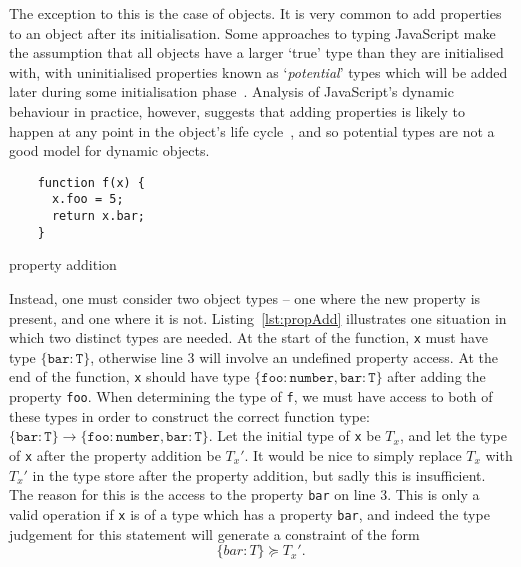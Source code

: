 \documentclass[12pt,a4paper,twoside,openright]{report}
\begin{document}
The exception to this is the case of objects. It is very common to add
properties to an object after its initialisation. Some approaches to typing
JavaScript make the assumption that all objects have a larger `true' type than
they are initialised with, with uninitialised properties known as
`\textit{potential}' types which will be added later during some initialisation
phase~\cite{anderson05}. Analysis of JavaScript's dynamic behaviour in
practice, however, suggests that adding properties is likely to happen at any
point in the object's life cycle~\cite{JSBehaviour}, and so potential types are
not a good model for dynamic objects.

\begin{program}[h]
	\begin{verbatim}
	function f(x) {
	  x.foo = 5;
	  return x.bar;
	}
  \end{verbatim}
  \caption{property addition}\label{lst:propAdd}
\end{program}

Instead, one must consider two object types -- one where the new property is
present, and one where it is not. Listing~\ref{lst:propAdd} illustrates one
situation in which two distinct types are needed. At the start of the function,
\texttt{x} must have type $\mathtt{\{bar:T\}}$, otherwise line 3 will involve
an undefined property access. At the end of the function, \texttt{x} should
have type $\mathtt{\{foo:number, bar:T\}}$ after adding the property
\texttt{foo}.  When determining the type of \texttt{f}, we must have access to
both of these types in order to construct the correct function type:
$\mathtt{\{bar:T\} \rightarrow \{foo:number, bar:T\}}$. Let the initial type of
\texttt{x} be $T_x$, and let the type of \texttt{x} after the property addition
be $T_x'$. It would be nice to simply replace $T_x$ with $T_x'$ in the type
store after the property addition, but sadly this is insufficient. The reason
for this is the access to the property \texttt{bar} on line 3.  This is only a
valid operation if \texttt{x} is of a type which has a property \texttt{bar},
and indeed the type judgement for this statement will generate a constraint of
the form 
\begin{equation}
  \label{eq:barC}
  \{bar:T\} \succeq T_x'.
\end{equation}
\end{document}
